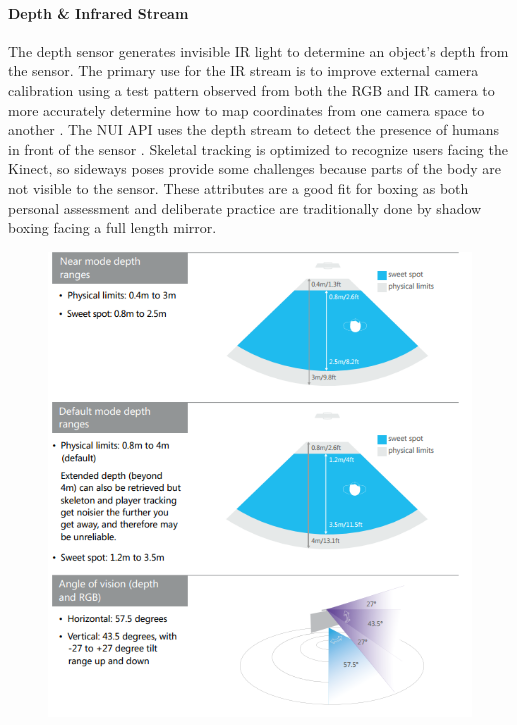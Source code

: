 \paragraph{Depth \& Infrared Stream}
The depth sensor generates invisible IR light to determine an object's depth from the sensor. The primary use for the IR stream is to improve external camera calibration using a test pattern observed from both the RGB and IR camera to more accurately determine how to map coordinates from one camera space to another \cite{irstream}. The NUI API uses the depth stream to detect the presence of humans in front of the sensor \cite{winSDK}. Skeletal tracking is optimized to recognize users facing the Kinect, so sideways poses provide some challenges because parts of the body are not visible to the sensor.
These attributes are a good fit for boxing as both personal assessment and deliberate practice are traditionally done by shadow boxing facing a full length mirror.

\begin{figure}[h]
    \centering
    \includegraphics[height=0.45\textheight]{fig02/kinDepth}
    \label{fig:kinsdepth}
\end{figure}


